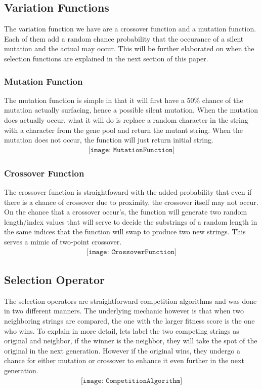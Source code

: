 \documentclass[paper=a4, fontsize=11pt]{scrartcl}
\numberwithin{equation}{section}		%
\numberwithin{figure}{section}			%
\numberwithin{table}{section}				%
\begin{document}
    \subsection{Variation Functions}
    The variation function we have are a crossover function and a mutation function.  Each of them add a random
    chance probability that the occurance of a silent mutation and the actual may occur.  This will be further 
    elaborated on when the selection functions are explained in the next section of this paper.

    \subsubsection{Mutation Function}
    The mutation function is simple in that it will first have a 50\% chance of the mutation actually surfacing,
    hence a possible silent mutation.  When the mutation does actually occur, what it will do is replace a random
    character in the string with a character from the gene pool  and return the mutant string.  When the mutation 
    does not occur, the function will just return initial string.
    \begin{align} 
        \texttt{[image: MutationFunction]}				
    \end{align}

    \subsubsection{Crossover Function}
    The crossover function is straightfoward with the added probability that even if there is a chance of crossover
    due to proximity, the crossover itself may not occur.  On the chance that a crossover occur's,  the function 
    will generate two random length/index values that will serve to decide the substrings of a random 
    length in the same indices that the function will swap to produce two new strings.  This serves a mimic of 
    two-point crossover.
    \begin{align} 
        \texttt{[image: CrossoverFunction]}				
    \end{align}
    \subsection{Selection Operator}
    The selection operators are straightforward competition algorithms and was done in two different manners.
    The underlying mechanic however is that when two neighboring strings  are compared, the one with the larger fitness
    score is the one who wins.  To explain in more detail, lets label the two competing strings as original and neighbor,  
    if the winner is the neighbor, they will take the spot of the original in the next generation.  However if the 
    original wins, they undergo a chance for either mutation or crossover to enhance it even further in the next generation.
    \begin{align} 
        \texttt{[image: CompetitionAlgorithm]}				
    \end{align}
\end{document}
